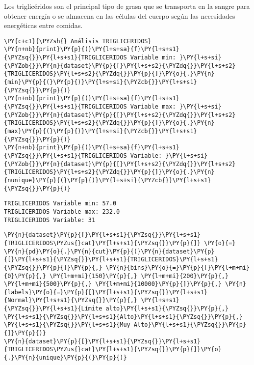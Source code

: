 Los triglicéridos son el principal tipo de grasa que se transporta en la sangre para obtener energía o se almacena en las células del cuerpo según las necesidades energéticas entre comidas.

    \begin{tcolorbox}[breakable, size=fbox, boxrule=1pt, pad at break*=1mm,colback=cellbackground, colframe=cellborder]
\begin{Verbatim}[commandchars=\\\{\}]
\PY{c+c1}{\PYZsh{} Análisis TRIGLICERIDOS}
\PY{n+nb}{print}\PY{p}{(}\PY{l+s+sa}{f}\PY{l+s+s1}{\PYZsq{}}\PY{l+s+s1}{TRIGLICERIDOS Variable min: }\PY{l+s+si}{\PYZob{}}\PY{n}{dataset}\PY{p}{[}\PY{l+s+s2}{\PYZdq{}}\PY{l+s+s2}{TRIGLICERIDOS}\PY{l+s+s2}{\PYZdq{}}\PY{p}{]}\PY{o}{.}\PY{n}{min}\PY{p}{(}\PY{p}{)}\PY{l+s+si}{\PYZcb{}}\PY{l+s+s1}{\PYZsq{}}\PY{p}{)}
\PY{n+nb}{print}\PY{p}{(}\PY{l+s+sa}{f}\PY{l+s+s1}{\PYZsq{}}\PY{l+s+s1}{TRIGLICERIDOS Variable max: }\PY{l+s+si}{\PYZob{}}\PY{n}{dataset}\PY{p}{[}\PY{l+s+s2}{\PYZdq{}}\PY{l+s+s2}{TRIGLICERIDOS}\PY{l+s+s2}{\PYZdq{}}\PY{p}{]}\PY{o}{.}\PY{n}{max}\PY{p}{(}\PY{p}{)}\PY{l+s+si}{\PYZcb{}}\PY{l+s+s1}{\PYZsq{}}\PY{p}{)}
\PY{n+nb}{print}\PY{p}{(}\PY{l+s+sa}{f}\PY{l+s+s1}{\PYZsq{}}\PY{l+s+s1}{TRIGLICERIDOS Variable: }\PY{l+s+si}{\PYZob{}}\PY{n}{dataset}\PY{p}{[}\PY{l+s+s2}{\PYZdq{}}\PY{l+s+s2}{TRIGLICERIDOS}\PY{l+s+s2}{\PYZdq{}}\PY{p}{]}\PY{o}{.}\PY{n}{nunique}\PY{p}{(}\PY{p}{)}\PY{l+s+si}{\PYZcb{}}\PY{l+s+s1}{\PYZsq{}}\PY{p}{)}
\end{Verbatim}
\end{tcolorbox}

    \begin{Verbatim}[commandchars=\\\{\}]
TRIGLICERIDOS Variable min: 57.0
TRIGLICERIDOS Variable max: 232.0
TRIGLICERIDOS Variable: 31
    \end{Verbatim}

    \begin{tcolorbox}[breakable, size=fbox, boxrule=1pt, pad at break*=1mm,colback=cellbackground, colframe=cellborder]
\begin{Verbatim}[commandchars=\\\{\}]
\PY{n}{dataset}\PY{p}{[}\PY{l+s+s1}{\PYZsq{}}\PY{l+s+s1}{TRIGLICERIDOS\PYZus{}cat}\PY{l+s+s1}{\PYZsq{}}\PY{p}{]} \PY{o}{=} \PY{n}{pd}\PY{o}{.}\PY{n}{cut}\PY{p}{(}\PY{n}{dataset}\PY{p}{[}\PY{l+s+s1}{\PYZsq{}}\PY{l+s+s1}{TRIGLICERIDOS}\PY{l+s+s1}{\PYZsq{}}\PY{p}{]}\PY{p}{,} \PY{n}{bins}\PY{o}{=}\PY{p}{[}\PY{l+m+mi}{0}\PY{p}{,} \PY{l+m+mi}{150}\PY{p}{,} \PY{l+m+mi}{200}\PY{p}{,} \PY{l+m+mi}{500}\PY{p}{,} \PY{l+m+mi}{10000}\PY{p}{]}\PY{p}{,} \PY{n}{labels}\PY{o}{=}\PY{p}{[}\PY{l+s+s1}{\PYZsq{}}\PY{l+s+s1}{Normal}\PY{l+s+s1}{\PYZsq{}}\PY{p}{,} \PY{l+s+s1}{\PYZsq{}}\PY{l+s+s1}{Límite alto}\PY{l+s+s1}{\PYZsq{}}\PY{p}{,} \PY{l+s+s1}{\PYZsq{}}\PY{l+s+s1}{Alto}\PY{l+s+s1}{\PYZsq{}}\PY{p}{,} \PY{l+s+s1}{\PYZsq{}}\PY{l+s+s1}{Muy Alto}\PY{l+s+s1}{\PYZsq{}}\PY{p}{]}\PY{p}{)}
\PY{n}{dataset}\PY{p}{[}\PY{l+s+s1}{\PYZsq{}}\PY{l+s+s1}{TRIGLICERIDOS\PYZus{}cat}\PY{l+s+s1}{\PYZsq{}}\PY{p}{]}\PY{o}{.}\PY{n}{unique}\PY{p}{(}\PY{p}{)}
\end{Verbatim}
\end{tcolorbox}

